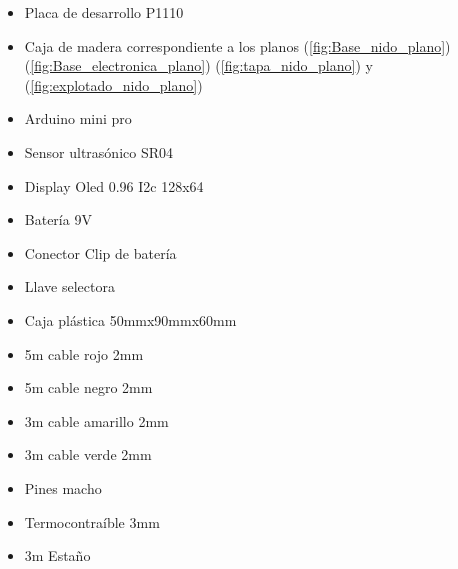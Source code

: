 \begin{itemize}

\item Placa de desarrollo P1110
\item Caja de madera correspondiente a los planos (\ref{fig:Base_nido_plano}) (\ref{fig:Base_electronica_plano}) (\ref{fig:tapa_nido_plano}) y (\ref{fig:explotado_nido_plano})
\item Arduino mini pro
\item Sensor ultras\'onico SR04
\item Display Oled 0.96 I2c 128x64
\item Bater\'ia 9V
\item Conector Clip de bater\'ia
\item Llave selectora
\item Caja pl\'astica 50mmx90mmx60mm

\end{itemize}
\begin{itemize}
\item 5m cable rojo 2mm
\item 5m cable negro 2mm
\item 3m cable amarillo 2mm
\item 3m cable verde 2mm
\item Pines macho
\item Termocontra\'ible 3mm
\item 3m Estaño

\end{itemize}









